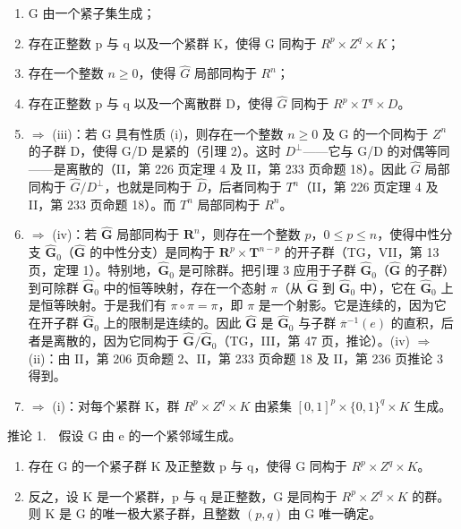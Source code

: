 \begin{enumerate}
\def\labelenumi{(\roman{enumi})}
\item
  G 由一个紧子集生成；
\item
  存在正整数 p 与 q 以及一个紧群 K，使得 G 同构于 \(R^{p} \times Z^{q} \times K\)；
\item
  存在一个整数 \(n \geqslant 0\)，使得 \(\widehat{G}\) 局部同构于 \(R^{n}\)；
\item
  存在正整数 p 与 q 以及一个离散群 D，使得 \(\widehat{G}\) 同构于 \(R^{p} \times T^{q} \times D\)。
\item
  \(\Longrightarrow\) (iii)：若 G 具有性质 (i)，则存在一个整数 \(n \geqslant 0\) 及 G 的一个同构于 \(Z^{n}\) 的子群 D，使得 G/D 是紧的（引理 2）。这时 \(D^{\perp}\)——它与 G/D 的对偶等同——是离散的（II，第 226 页定理 4 及 II，第 233 页命题 18）。因此 \(\widehat{G}\) 局部同构于 \(\widehat{G}/D^{\perp}\)，也就是同构于 \(\widehat{D}\)，后者同构于 \(T^{n}\)（II，第 226 页定理 4 及 II，第 233 页命题 18）。而 \(T^{n}\) 局部同构于 \(R^{n}\)。
\item
  \(\Longrightarrow\) (iv)：若 \(\widehat{\mathbf{G}}\) 局部同构于 \(\mathbf{R}^n\)，则存在一个整数 \(p\)，\(0 \leqslant p \leqslant n\)，使得中性分支 \(\widehat{\mathbf{G}}_0\)（\(\widehat{\mathbf{G}}\) 的中性分支）是同构于 \(\mathbf{R}^p \times \mathbf{T}^{n-p}\) 的开子群（TG，VII，第 13 页，定理 1）。特别地，\(\widehat{\mathbf{G}}_0\) 是可除群。把引理 3 应用于子群 \(\widehat{\mathbf{G}}_0\)（\(\widehat{\mathbf{G}}\) 的子群）到可除群 \(\widehat{\mathbf{G}}_0\) 中的恒等映射，存在一个态射 \(\pi\)（从 \(\widehat{\mathbf{G}}\) 到 \(\widehat{\mathbf{G}}_0\) 中），它在 \(\widehat{\mathbf{G}}_0\) 上是恒等映射。于是我们有 \(\pi \circ \pi = \pi\)，即 \(\pi\) 是一个射影。它是连续的，因为它在开子群 \(\widehat{\mathbf{G}}_0\) 上的限制是连续的。因此 \(\widehat{\mathbf{G}}\) 是 \(\widehat{\mathbf{G}}_0\) 与子群 \(\overline{\pi}^{-1}(e)\) 的直积，后者是离散的，因为它同构于 \(\widehat{\mathbf{G}} / \widehat{\mathbf{G}}_0\)（TG，III，第 47 页，推论）。(iv) \(\Longrightarrow\) (ii)：由 II，第 206 页命题 2、II，第 233 页命题 18 及 II，第 236 页推论 3 得到。
\item
  \(\Longrightarrow\) (i)：对每个紧群 K，群 \(R^{p} \times Z^{q} \times K\) 由紧集 \([0,1]^{p} \times \{0,1\}^{q} \times K\) 生成。
\end{enumerate}

推论 1.　假设 G 由 e 的一个紧邻域生成。

\begin{enumerate}
\def\labelenumi{\alph{enumi})}
\item
  存在 G 的一个紧子群 K 及正整数 p 与 q，使得 G 同构于 \(R^{p} \times Z^{q} \times K\)。
\item
  反之，设 K 是一个紧群，p 与 q 是正整数，G 是同构于 \(R^{p} \times Z^{q} \times K\) 的群。则 K 是 G 的唯一极大紧子群，且整数 \((p,q)\) 由 G 唯一确定。
\end{enumerate}

